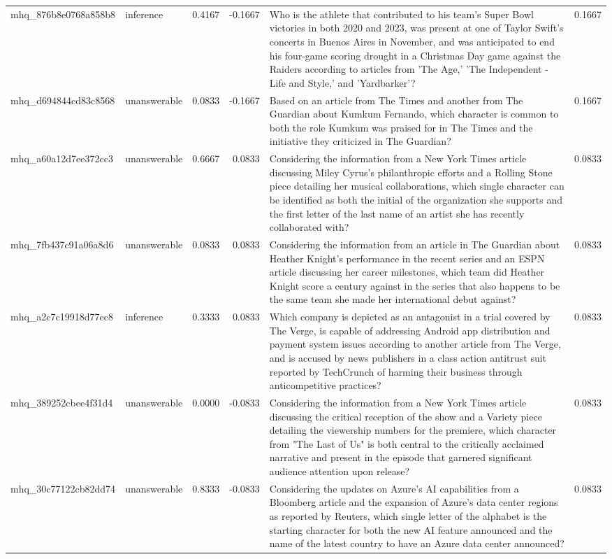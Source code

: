 \begin{tabular}{llrrlr}
mhq_876b8e0768a858b8 & inference & 0.4167 & -0.1667 & Who is the athlete that contributed to his team's Super Bowl victories in both 2020 and 2023, was present at one of Taylor Swift's concerts in Buenos Aires in November, and was anticipated to end his four-game scoring drought in a Christmas Day game against the Raiders according to articles from 'The Age,' 'The Independent - Life and Style,' and 'Yardbarker'? & 0.1667 \\
mhq_d694844cd83c8568 & unanswerable & 0.0833 & -0.1667 & Based on an article from The Times and another from The Guardian about Kumkum Fernando, which character is common to both the role Kumkum was praised for in The Times and the initiative they criticized in The Guardian? & 0.1667 \\
mhq_a60a12d7ee372cc3 & unanswerable & 0.6667 & 0.0833 & Considering the information from a New York Times article discussing Miley Cyrus's philanthropic efforts and a Rolling Stone piece detailing her musical collaborations, which single character can be identified as both the initial of the organization she supports and the first letter of the last name of an artist she has recently collaborated with? & 0.0833 \\
mhq_7fb437c91a06a8d6 & unanswerable & 0.0833 & 0.0833 & Considering the information from an article in The Guardian about Heather Knight's performance in the recent series and an ESPN article discussing her career milestones, which team did Heather Knight score a century against in the series that also happens to be the same team she made her international debut against? & 0.0833 \\
mhq_a2c7c19918d77ec8 & inference & 0.3333 & 0.0833 & Which company is depicted as an antagonist in a trial covered by The Verge, is capable of addressing Android app distribution and payment system issues according to another article from The Verge, and is accused by news publishers in a class action antitrust suit reported by TechCrunch of harming their business through anticompetitive practices? & 0.0833 \\
mhq_389252cbee4f31d4 & unanswerable & 0.0000 & -0.0833 & Considering the information from a New York Times article discussing the critical reception of the show and a Variety piece detailing the viewership numbers for the premiere, which character from "The Last of Us" is both central to the critically acclaimed narrative and present in the episode that garnered significant audience attention upon release? & 0.0833 \\
mhq_30c77122cb82dd74 & unanswerable & 0.8333 & -0.0833 & Considering the updates on Azure's AI capabilities from a Bloomberg article and the expansion of Azure's data center regions as reported by Reuters, which single letter of the alphabet is the starting character for both the new AI feature announced and the name of the latest country to have an Azure data center announced? & 0.0833 \\

\end{tabular}
